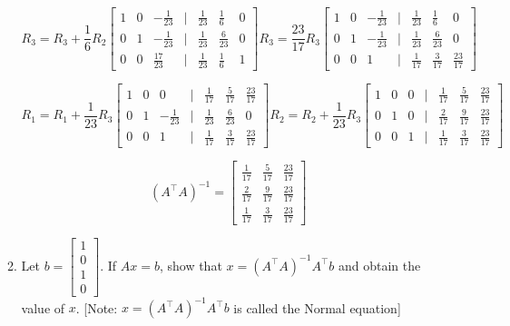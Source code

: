 \documentclass[11pt]{article}
\begin{document}
\begin{enumerate}
\begin{enumerate}
\[
    R_3 = R_3 + \frac{1}{6}R_2
    \begin{bmatrix}
        1 & 0 & -\frac{1}{23} &|& \frac{1}{23} & \frac{1}{6} & 0 \\
        0 & 1 & -\frac{1}{23} &|& \frac{1}{23} & \frac{6}{23} & 0 \\
        0 & 0 & \frac{17}{23} &|& \frac{1}{23} & \frac{1}{6} & 1
    \end{bmatrix}
    R_3 = \frac{23}{17}R_3
    \begin{bmatrix}
        1 & 0 & -\frac{1}{23} &|& \frac{1}{23} & \frac{1}{6} & 0 \\
        0 & 1 & -\frac{1}{23} &|& \frac{1}{23} & \frac{6}{23} & 0 \\
        0 & 0 & 1 &|& \frac{1}{17} & \frac{3}{17} & \frac{23}{17}
    \end{bmatrix}
\]

\[
    R_1 = R_1 + \frac{1}{23}R_3
    \begin{bmatrix}
        1 & 0 & 0 &|& \frac{1}{17} & \frac{5}{17} & \frac{23}{17} \\
        0 & 1 & -\frac{1}{23} &|& \frac{1}{23} & \frac{6}{23} & 0 \\
        0 & 0 & 1 &|& \frac{1}{17} & \frac{3}{17} & \frac{23}{17}
    \end{bmatrix}
    R_2 = R_2 + \frac{1}{23}R_3
    \begin{bmatrix}
        1 & 0 & 0 &|& \frac{1}{17} & \frac{5}{17} & \frac{23}{17} \\
        0 & 1 & 0 &|& \frac{2}{17} & \frac{9}{17} & \frac{23}{17} \\
        0 & 0 & 1 &|& \frac{1}{17} & \frac{3}{17} & \frac{23}{17}
    \end{bmatrix}
\]

\[
    (A^\top A)^{-1} = \begin{bmatrix}
        \frac{1}{17} & \frac{5}{17} & \frac{23}{17} \\
        \frac{2}{17} & \frac{9}{17} & \frac{23}{17} \\
        \frac{1}{17} & \frac{3}{17} & \frac{23}{17}
    \end{bmatrix}
\]

\item  Let \( b = \begin{bmatrix}
    1 \\
    0 \\
    1 \\
    0
\end{bmatrix} \). If \( Ax = b \), show that \( x = (A^\top A)^{-1}A^\top b \) and obtain the value of \( x \). [Note: \( x = (A^\top A)^{-1}A^\top b \) is called the Normal equation]


\end{enumerate}
\end{enumerate}
\end{document}

